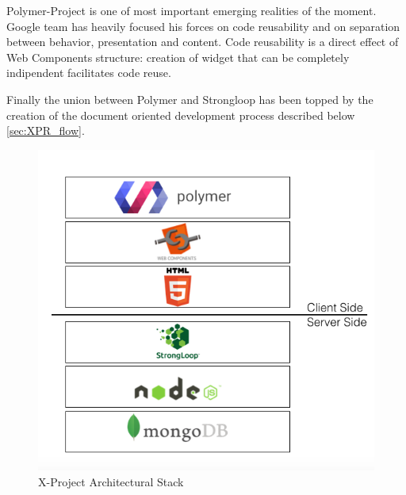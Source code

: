 Polymer-Project is one of most important emerging realities of the moment.
Google team has heavily focused his forces on code reusability and on separation between behavior, presentation and content.
Code reusability is a direct effect of Web Components structure: creation of widget that can be completely indipendent facilitates code reuse.

Finally the union between Polymer and Strongloop has been topped by the creation of the document oriented development process described below \ref{sec:XPR_flow}. 

\begin {figure}[h]
\graphicspath{{images/chapter_xpr/}}
\includegraphics[width=\textwidth]{XPR_stack}
\caption{X-Project Architectural Stack }
\end {figure}